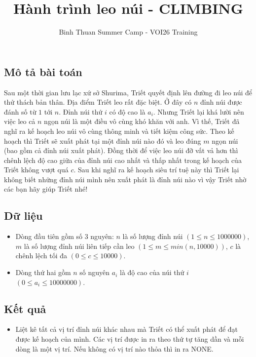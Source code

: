 \documentclass[12pt]{article}
\begin{document}
\title{Hành trình leo núi - CLIMBING}
\author{Binh Thuan Summer Camp - VOI26 Training}
\maketitle

\setlength{\parindent}{0pt}
\setlength{\parskip}{1em} 

\subsection*{Mô tả bài toán}
Sau một thời gian lưu lạc xứ sở Shurima, Triết quyết định lên đường đi leo núi để thử thách bản thân. Địa điểm
Triết leo rất đặc biệt. Ở đây có $n$ đỉnh núi được đánh số từ $1$ tới $n$. Đỉnh núi thứ $i$ có độ cao là $a_i$.
Nhưng Triết lại khá lười nên việc leo cả $n$ ngọn núi là một điều vô cùng khó khăn với anh. Vì thế, Triết
đã nghĩ ra kế hoạch leo núi vô cùng thông minh và tiết kiệm công sức. Theo kế hoạch thì Triết sẽ
xuất phát tại một đỉnh núi nào đó và leo đúng $m$ ngọn núi (bao gồm cả đỉnh núi xuất phát). Đồng
thời để việc leo núi đỡ vất vả hơn thì chênh lệch độ cao giữa của đỉnh núi cao nhất và thấp nhất
trong kế hoạch của Triết không vượt quá $c$. Sau khi nghĩ ra kế hoạch siêu trí tuệ này thì Triết lại
không biết những đỉnh núi mình nên xuất phát là đỉnh núi nào vì vậy Triết nhờ các bạn hãy giúp
Triết nhé!

\subsection*{Dữ liệu}
\begin{itemize}
  \item Dòng đầu tiên gồm số 3 nguyên: $n$ là số lượng đỉnh núi $(1 \leq n \leq 1000000)$, $m$ là số lượng
  đỉnh núi liên tiếp cần leo $(1 \leq m \leq min(n, 10000))$, $c$ là chênh lệch tối đa $(0 \leq c \leq 10000)$.
  \item Dòng thứ hai gồm $n$ số nguyên $a_i$ là độ cao của núi thứ $i$ $(0 \leq a_i \leq 10000000)$.
\end{itemize}

\subsection*{Kết quả}
\begin{itemize}
  \item Liệt kê tất cả vị trí đỉnh núi khác nhau mà Triết có thể xuất phát để đạt được kế hoạch của mình.
  Các vị trí được in ra theo thứ tự tăng dần và mỗi dòng là một vị trí. Nếu không có vị trí nào thỏa
  thì in ra NONE.
\end{itemize}
\end{document}
